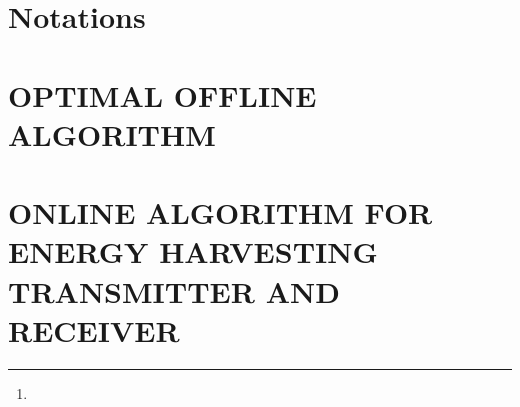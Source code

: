 \documentclass[10pt,twocolumn,twoside]{IEEEtran}
\title{}
\author{
\thanks{}
}
\begin{document}
\maketitle
\thispagestyle{empty}
\pagestyle{empty}
\begin{abstract}
\end{abstract}


\begin{IEEEkeywords}
\end{IEEEkeywords}

\section{Notations}


\section{OPTIMAL OFFLINE ALGORITHM}


\section{ONLINE ALGORITHM FOR ENERGY HARVESTING TRANSMITTER AND RECEIVER}


\appendices


 
\end{document}

